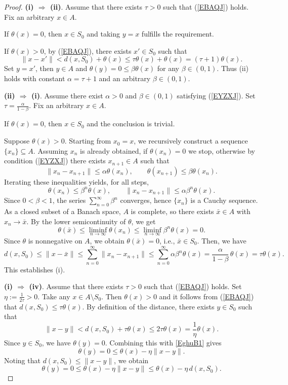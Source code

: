 \documentclass[11pt]{article}
\begin{document}
\begin{proof}   	\noindent\textbf{(i) $\Rightarrow$ (ii)}.
	Assume  that   there exists $\tau>0$ such that  (\ref{EBAQJ}) holds.   
	Fix an arbitrary \(x \in A\). 
	
	If \(\theta(x) = 0\), then \(x \in S_0\) and taking \(y = x\) fulfills the requirement.
	
	If \(\theta(x) > 0\),  by   (\ref{EBAQJ}),     there exists \(x' \in S_0\) such that
	\[
	\|x - x'\| < d(x,S_0) + \theta(x) \le \tau\theta(x) + \theta(x) = (\tau+1)\theta(x).
	\]
	Set \(y = x'\),   then \(y \in A\) and \(\theta(y) = 0 \le \beta\theta(x)\) for any \(\beta \in (0,1)\). Thus (ii) holds with constant \(\alpha = \tau+1\) and an arbitrary \(\beta \in (0,1)\).
	
	
	
	\noindent\textbf{(ii) $\Rightarrow$ (i)}.
	Assume there exist \(\alpha>0\) and \(\beta \in (0,1)\) satisfying  (\ref{EYZXJ}). Set \(\tau = \frac{\alpha}{1-\beta}\).
	Fix an arbitrary \(x \in A\). 
	
	If \(\theta(x)=0\), then \(x \in S_0\) and the conclusion is trivial. 
	
	Suppose \(\theta(x) > 0\). Starting from \(x_0 = x\), we recursively construct a sequence \(\{x_n\} \subseteq A\). 
	Assuming \(x_n\) is already obtained, if \(\theta(x_n) = 0\) we stop,  otherwise by condition (\ref{EYZXJ}) there exists \(x_{n+1} \in A\) such that
	\[
	\|x_n - x_{n+1}\| \le \alpha \theta(x_n), \qquad \theta(x_{n+1}) \le \beta \theta(x_n).
	\]
	Iterating these inequalities yields, for all steps,
	\[
	\theta(x_n) \le \beta^n \theta(x), \qquad \|x_n - x_{n+1}\| \le \alpha \beta^n \theta(x).
	\]
	Since \(0 < \beta < 1\), the series \(\sum_{n=0}^\infty \beta^n\) converges, hence \(\{x_n\}\) is a Cauchy sequence. As a closed subset of a Banach space, \(A\) is complete, so there exists  \(\bar{x} \in A\) with \(x_n \to \bar{x}\). 
	By the       lower semicontinuity of \(\theta\), we get 
	\[
	\theta(\bar{x}) \le    	\liminf_{n \to \infty} \theta(x_n) \le   	\liminf_{n \to \infty} \beta^n \theta(x) = 0.
	\]
	Since \(\theta\) is nonnegative on \(A\), we obtain \(\theta(\bar{x}) = 0\), i.e., \(\bar{x} \in S_0\).   Then, we have
	\[ d(x,S_0) \le
	\|x - \bar{x}\| \le \sum_{n=0}^{\infty} \|x_n - x_{n+1}\|
	\le \sum_{n=0}^{\infty} \alpha \beta^n \theta(x)
	= \frac{\alpha}{1-\beta}\,\theta(x) = \tau \theta(x).
	\]
	This establishes (i).
	
	\noindent\textbf{(i) $\Rightarrow$ (iv)}.  Assume that there exists \(\tau>0\) such that   (\ref{EBAQJ}) holds.
	Set \(\eta:=\frac{1}{2\tau}>0\). 
	Take any \(x\in A\setminus S_0\). Then \(\theta(x)>0\) and     it follows from  (\ref{EBAQJ})  that     \(d(x,S_0)\le\tau\theta(x)\). By definition of the distance, there exists \(y\in S_0\) such that
	\begin{equation}\label{EghuB1}
		\|x-y\|<d(x,S_0)+\tau\theta(x)\le 2\tau\theta(x)=\frac{1}{\eta}\theta(x).
	\end{equation}
	Since \(y\in S_0\), we have \(\theta(y)=0\). Combining this with \eqref{EghuB1} gives
	\[
	\theta(y)=0\le \theta(x)-\eta \|x-y\|.
	\]
	Noting that \(d(x,S_0)\le \|x-y\|\), we obtain
	\[
	\theta(y)=0\le \theta(x)- \eta  \|x-y\|   \le \theta(x) - \eta\,d(x,S_0).
	\]
	

\end{proof}
\end{document}
